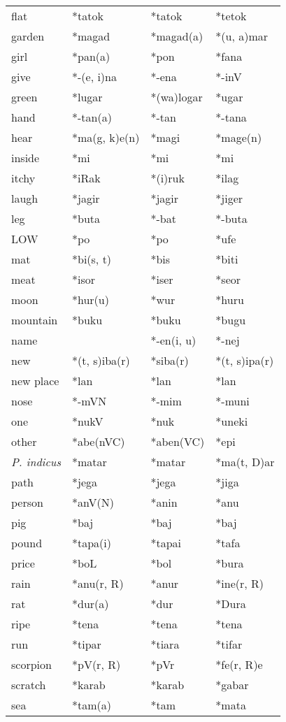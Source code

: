 \documentclass[a4paper]{article}
\begin{document}
\begin{center}
\begin{supertabular}{m{0.9011598in}m{0.81295985in}m{0.81295985in}m{0.83515984in}}
flat &
*tatok &
*tatok &
*tetok\\
garden &
*magad &
*magad(a) &
*(u, a)mar\\
girl &
*pan(a) &
*pon &
*fana\\
give &
*-(e, i)na &
*-ena &
*-inV\\
green &
*lugar &
*(wa)logar &
*ugar\\
hand &
*-tan(a) &
*-tan &
*-tana\\
hear &
*ma(g, k)e(n) &
*magi &
*mage(n)\\
inside &
*mi &
*mi &
*mi\\
itchy &
*iRak &
*(i)ruk &
*ilag\\
laugh &
*jagir &
*jagir &
*jiger\\
leg &
*buta &
*-bat &
*-buta\\
LOW &
*po &
*po &
*ufe\\
mat &
*bi(s, t) &
*bis &
*biti\\
meat &
*isor &
*iser &
*seor\\
moon &
*hur(u) &
*wur &
*huru\\
mountain &
*buku &
*buku &
*bugu\\
name &
 &
*-en(i, u) &
*-nej\\
new &
*(t, s)iba(r) &
*siba(r) &
*(t, s)ipa(r)\\
new place &
*lan &
*lan &
*lan\\
nose &
*-mVN &
*-mim &
*-muni\\
one &
*nukV &
*nuk &
*uneki\\
other &
*abe(nVC) &
*aben(VC) &
*epi\\
\textit{P. indicus} &
*matar &
*matar &
*ma(t, D)ar\\
path &
*jega &
*jega &
*jiga\\
person &
*anV(N) &
*anin &
*anu\\
pig &
*baj &
*baj &
*baj\\
pound &
*tapa(i) &
*tapai &
*tafa\\
price &
*boL &
*bol &
*bura\\
rain &
*anu(r, R) &
*anur &
*ine(r, R)\\
rat &
*dur(a) &
*dur &
*Dura\\
ripe &
*tena &
*tena &
*tena\\
run &
*tipar &
*tiara &
*tifar\\
scorpion &
*pV(r, R) &
*pVr &
*fe(r, R)e\\
scratch &
*karab &
*karab &
*gabar\\
sea &
*tam(a) &
*tam &
*mata\\

\end{supertabular}
\end{center}
\end{document}
